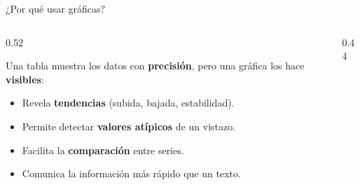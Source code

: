 \documentclass[aspectratio=169, 10pt, spanish]{beamer}
\begin{document}
\begin{frame}[plain]
  \titlepage
\end{frame}

\begin{frame}{¿Por qué usar gráficas?}
  \begin{columns}[T]
    \begin{column}{0.52\textwidth}
      \begin{teoriabox}
        \AlmFontSmall
        Una tabla muestra los datos con \textbf{precisión},
        pero una gráfica los hace \textbf{visibles}:
        \begin{itemize}
          \item Revela \textbf{tendencias} (subida, bajada, estabilidad).
          \item Permite detectar \textbf{valores atípicos} de un vistazo.
          \item Facilita la \textbf{comparación} entre series.
          \item Comunica la información más rápido que un texto.
        \end{itemize}
      \end{teoriabox}
    \end{column}
    \begin{column}{0.44\textwidth}
      \begin{notabox}
        \AlmFontSmall
        \begin{center}
        \end{center}
      \end{notabox}
    \end{column}
  \end{columns}
\end{frame}
\end{document}
